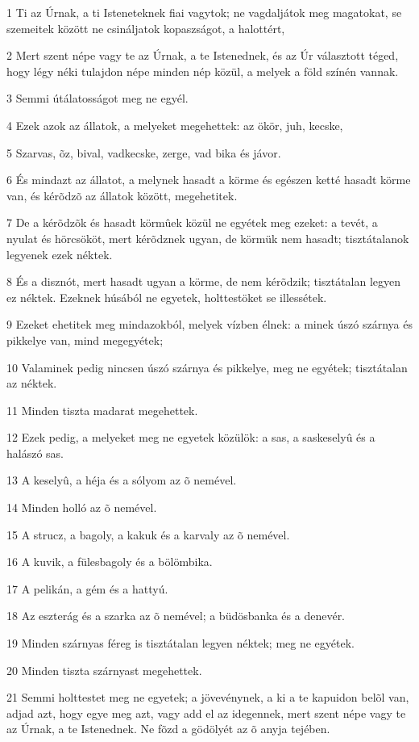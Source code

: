 \par 1 Ti az Úrnak, a ti Isteneteknek fiai vagytok; ne  vagdaljátok meg magatokat, se szemeitek között ne csináljatok kopaszságot, a halottért,
\par 2 Mert szent népe vagy te az Úrnak, a te Istenednek, és az Úr választott téged, hogy légy néki tulajdon népe minden nép közül, a melyek a föld színén vannak.
\par 3 Semmi útálatosságot meg ne egyél.
\par 4 Ezek azok az állatok, a melyeket megehettek: az ökör, juh, kecske,
\par 5 Szarvas, õz, bival, vadkecske, zerge, vad bika és jávor.
\par 6 És mindazt az állatot, a melynek hasadt a körme és egészen ketté hasadt körme van, és kérõdzõ az állatok között, megehetitek.
\par 7 De a kérõdzõk és hasadt körmûek közül ne egyétek meg ezeket: a tevét, a nyulat és hörcsököt, mert kérõdznek ugyan, de körmük nem hasadt; tisztátalanok legyenek ezek néktek.
\par 8 És a disznót, mert hasadt ugyan a körme, de nem kérõdzik; tisztátalan legyen ez néktek. Ezeknek húsából ne egyetek, holttestöket se illessétek.
\par 9 Ezeket ehetitek meg mindazokból, melyek vízben élnek: a minek úszó szárnya és pikkelye van, mind megegyétek;
\par 10 Valaminek pedig nincsen úszó szárnya és pikkelye, meg ne egyétek; tisztátalan az néktek.
\par 11 Minden tiszta madarat megehettek.
\par 12 Ezek pedig, a melyeket meg ne egyetek közülök: a sas, a saskeselyû és a halászó sas.
\par 13 A keselyû, a héja és a sólyom az õ nemével.
\par 14 Minden holló az õ nemével.
\par 15 A strucz, a bagoly, a kakuk és a karvaly az õ nemével.
\par 16 A kuvik, a fülesbagoly és a bölömbika.
\par 17 A pelikán, a gém és a hattyú.
\par 18 Az eszterág és a szarka az õ nemével; a büdösbanka és a denevér.
\par 19 Minden szárnyas féreg is tisztátalan legyen néktek; meg ne egyétek.
\par 20 Minden tiszta szárnyast megehettek.
\par 21 Semmi holttestet meg ne egyetek; a jövevénynek, a ki a te kapuidon belõl van, adjad azt, hogy egye meg azt, vagy add el az idegennek, mert szent népe vagy te az Úrnak, a te Istenednek. Ne fõzd a  gödölyét az õ anyja tejében.
